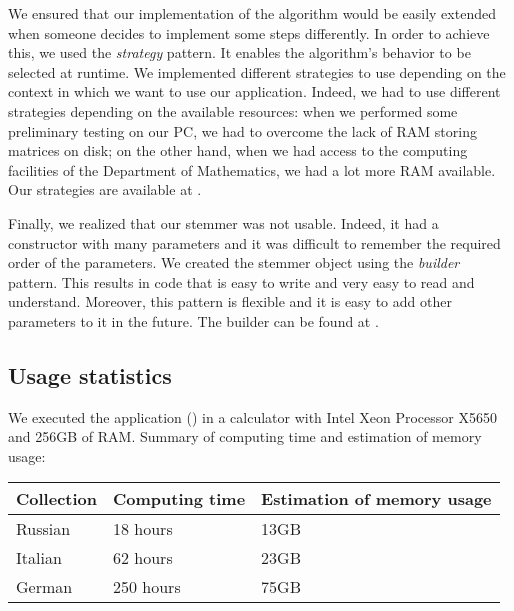             We ensured that our implementation of the algorithm would be easily extended when someone decides to implement some steps differently.
            In order to achieve this, we used the \emph{strategy} pattern. It enables the algorithm's behavior to be selected at runtime. We implemented different strategies to use depending on the context in which we want to use our application. Indeed, we had to use different strategies depending on the available resources: when we performed some preliminary testing on our PC, we had to overcome the lack of RAM storing matrices on disk; on the other hand, when we had access to the computing facilities of the Department of Mathematics\footnotemark{}, we had a lot more RAM available. Our strategies are available at .
            
            Finally, we realized that our stemmer was not usable. Indeed, it had a constructor with many parameters and it was difficult to remember the required order of the parameters. We created the stemmer object using the \emph{builder} pattern. This results in code that is easy to write and very easy to read and understand. Moreover, this pattern is flexible and it is easy to add other parameters to it in the future. The builder can be found at .


    \subsection{Usage statistics}
        We executed the application () in a calculator with Intel\textsuperscript{\textregistered} Xeon\textsuperscript{\textregistered} Processor X5650 and 256GB of RAM. Summary of computing time and estimation of memory usage:
        \begin{center}
			\begin{tabular}[H]{| p{} | p{} | p{} |}
                \hline
                Collection  & Computing time    & Estimation of memory usage \\ \hline\hline
				Russian     & 18 hours          & 13GB                       \\ \hline
                Italian     & 62 hours          & 23GB                       \\ \hline
                German      & 250 hours         & 75GB                       \\ \hline %
			\end{tabular}
        \end{center}